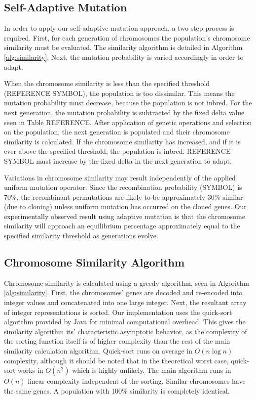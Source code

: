 \documentclass[conference]{IEEEtran}
\begin{document}
\subsection{Self-Adaptive Mutation}
In order to apply our self-adaptive mutation approach, a two step process is required. First, for each generation of chromosomes the population's chromosome similarity must be evaluated. The similarity algorithm is detailed in Algorithm \ref{alg:similarity}. Next, the mutation probability is varied accordingly in order to adapt.  

When the chromosome similarity is less than the specified threshold ({REFERENCE SYMBOL}), the population is too dissimilar. This means the mutation probability must decrease, because the population is not inbred. For the next generation, the mutation probability is subtracted by the fixed delta value seen in Table {REFERENCE}. After application of genetic operations and selection on the population, the next generation is populated and their chromosome similarity is calculated. If the chromosome similarity has increased, and if it is ever above the specified threshold, the population is inbred. {REFERENCE SYMBOL} must increase by the fixed delta in the next generation to adapt.

Variations in chromosome similarity may result independently of the applied uniform mutation operator. Since the recombination probability ({SYMBOL}) is 70\%, the recombinant permutations are likely to be approximately 30\% similar (due to cloning) unless uniform mutation has occurred on the cloned genes. Our experimentally observed result using adaptive mutation is that the chromosome similarity will approach an equilibrium percentage approximately equal to the specified similarity threshold as generations evolve.

\subsection{Chromosome Similarity Algorithm}
Chromosome similarity is calculated using a greedy algorithm, seen in Algorithm \ref{alg:similarity}. First, the chromosomes' genes are decoded and re-encoded into integer values and concatenated into one large integer. Next, the resultant array of integer representations is sorted. Our implementation uses the quick-sort algorithm provided by Java for minimal computational overhead. This gives the similarity algorithm its' characteristic asymptotic behavior, as the complexity of the sorting function itself is of higher complexity than the rest of the main similarity calculation algorithm. Quick-sort runs on average in $O(n \log n)$ complexity, although it should be noted that in the theoretical worst case, quick-sort works in $O(n^2)$ which is highly unlikely. The main algorithm runs in $O(n)$ linear complexity independent of the sorting. Similar chromosomes have the same genes. A population with 100\% similarity is completely identical.
\end{document}
